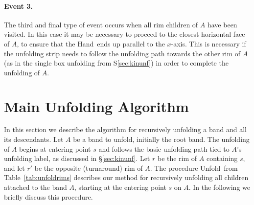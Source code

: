 \documentclass[11pt]{article}
\newcommand\hand{{\sc Hand}}
\newcommand\unfoldrims{{\sc Unfold}}
\begin{document}
\paragraph{Event 3.} The third and final type of event occurs when all rim children of $A$ have been visited. In this case it may be necessary to proceed to the closest horizontal face of $A$, to ensure that the \hand\ ends up parallel to the $x$-axis. This is necessary if the unfolding strip needs to follow the unfolding path towards the other rim of $A$ (as in the single box unfolding from S\ref{sec:kinunf}) in order to complete the unfolding of $A$.



\section{Main Unfolding Algorithm}
\label{sec:alg}
In this section we describe the algorithm for recursively unfolding a band and all its descendants. Let $A$ be a band to unfold, initially the root band. The unfolding of $A$ begins at entering point $s$ and follows the basic unfolding path tied to $A$'s unfolding label, as discussed in \S\ref{sec:kinunf}. Let $r$ be the rim of $A$ containing $s$, and let $r'$ be the opposite (turnaround) rim of $A$. The procedure \unfoldrims\ from Table~\ref{tab:unfoldrims} describes our method for recursively unfolding all children attached to the band $A$, starting at the entering point $s$ on $A$. In the following we briefly discuss this procedure.
\end{document}
